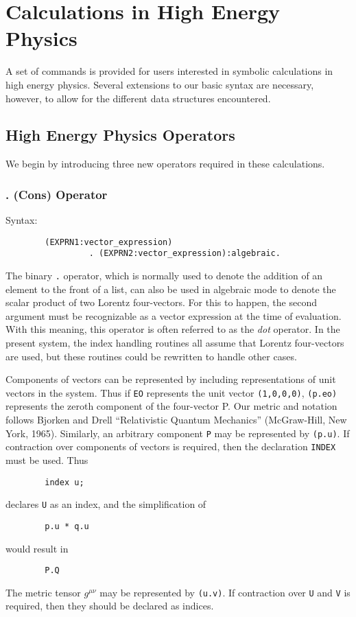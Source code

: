 \chapter{Calculations in High Energy Physics}

A set of {\REDUCE} commands is provided for users interested in symbolic
calculations in high energy physics. Several extensions to our basic
syntax are necessary, however, to allow for the different data structures
encountered.

\section{High Energy Physics Operators}
\label{HEPHYS}

We begin by introducing three new operators required in these calculations.

\subsection{. (Cons) Operator}
Syntax:
\begin{verbatim}
        (EXPRN1:vector_expression)
                 . (EXPRN2:vector_expression):algebraic.
\end{verbatim}
The binary {\tt .} operator, which is normally used to denote the addition
of an element to the front of a list, can also be used in algebraic mode
to denote the scalar product of two Lorentz four-vectors.  For this to
happen, the second argument must be recognizable as a vector expression
 at the time of
evaluation.  With this meaning, this operator is often referred to as the
{\em dot\/} operator.  In the present system, the index handling routines all
assume that Lorentz four-vectors are used, but these routines could be
rewritten to handle other cases.

Components of vectors can be represented by including representations of
unit vectors in the system.  Thus if {\tt EO} represents the unit vector
{\tt (1,0,0,0)}, {\tt (p.eo)} represents the zeroth component of the
four-vector P.  Our metric and notation follows Bjorken and Drell
``Relativistic Quantum Mechanics'' (McGraw-Hill, New York, 1965).
Similarly, an arbitrary component {\tt P} may be represented by
{\tt (p.u)}.  If contraction over components of vectors is required, then
the declaration {\tt INDEX} must be used.  Thus
\begin{verbatim}
        index u;
\end{verbatim}
declares {\tt U} as an index, and the simplification of
\begin{verbatim}
        p.u * q.u
\end{verbatim}
would result in
\begin{verbatim}
        P.Q
\end{verbatim}
The metric tensor $g^{\mu \nu}$ may be represented by {\tt (u.v)}.  If
contraction over {\tt U} and {\tt V} is required, then they should be
declared as indices.

